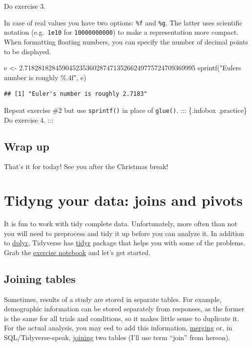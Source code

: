 \documentclass[
]{book}
\newenvironment{Shaded}{\begin{snugshade}}{\end{snugshade}}
\newcommand{\FloatTok}[1]{\textcolor[rgb]{0.00,0.00,0.81}{#1}}
\newcommand{\FunctionTok}[1]{\textcolor[rgb]{0.00,0.00,0.00}{#1}}
\newcommand{\NormalTok}[1]{#1}
\newcommand{\OtherTok}[1]{\textcolor[rgb]{0.56,0.35,0.01}{#1}}
\newcommand{\StringTok}[1]{\textcolor[rgb]{0.31,0.60,0.02}{#1}}
\begin{document}
Do exercise 3.

In case of real values you have two options: \texttt{\%f} and \texttt{\%g}. The latter uses scientific notation (e.g.~\texttt{1e10} for \texttt{10000000000}) to make a representation more compact. When formatting floating numbers, you can specify the number of decimal points to be displayed.

\begin{Shaded}
\begin{Highlighting}[]
\NormalTok{e }\OtherTok{\textless{}{-}} \FloatTok{2.71828182845904523536028747135266249775724709369995}
\FunctionTok{sprintf}\NormalTok{(}\StringTok{"Euler\textquotesingle{}s number is roughly \%.4f"}\NormalTok{, e)}
\end{Highlighting}
\end{Shaded}

\begin{verbatim}
## [1] "Euler's number is roughly 2.7183"
\end{verbatim}

Repeat exercise \#2 but use \texttt{sprintf()} in place of \texttt{glue()}.
::: \{.infobox .practice\}
Do exercise 4.
:::

\hypertarget{wrap-up-2}{%
\section{Wrap up}\label{wrap-up-2}}

That's it for today! See you after the Christmas break!

\hypertarget{tyding}{%
\chapter{Tidyng your data: joins and pivots}\label{tyding}}

It is fun to work with tidy complete data. Unfortunately, more often than not you will need to preprocess and tidy it up before you can analyze it. In addition to \href{https://dplyr.tidyverse.org/}{dplyr}, Tidyverse has \href{https://tidyr.tidyverse.org/}{tidyr} package that helps you with some of the problems. Grab the \href{notebooks/Seminar\%2008\%20-\%20tidyr.Rmd}{exercise notebook} and let's get started.

\hypertarget{joins}{%
\section{Joining tables}\label{joins}}

Sometimes, results of a study are stored in separate tables. For example, demographic information can be stored separately from responses, as the former is the same for all trials and conditions, so it makes little sense to duplicate it. For the actual analysis, you may eed to add this information, \href{https://stat.ethz.ch/R-manual/R-devel/library/base/html/merge.html}{merging} or, in SQL/Tidyverse-speak, \href{https://dplyr.tidyverse.org/reference/mutate-joins.html}{joining} two tables (I'll use term ``join'' from hereon).
\end{document}
